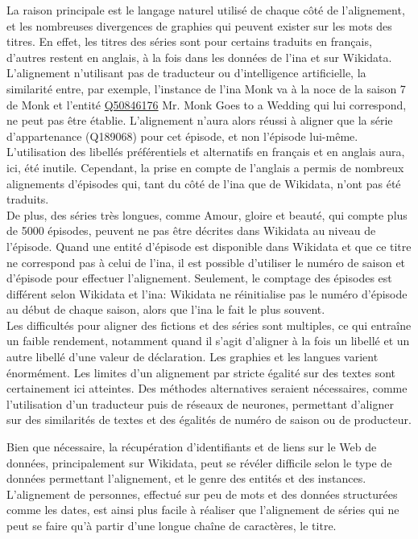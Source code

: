La raison principale est le langage naturel utilisé de chaque côté de l'alignement, et les nombreuses divergences de graphies qui peuvent exister sur les mots des titres. En effet, les titres des séries sont pour certains traduits en français, d'autres restent en anglais, à la fois dans les données de l'\ac{ina} et sur Wikidata. L'alignement n'utilisant pas de traducteur ou d'intelligence artificielle, la similarité entre, par exemple, l'instance de l'\ac{ina} \og Monk va à la noce\fg{} de la saison 7 de Monk et l'entité \href{https://www.wikidata.org/wiki/Q50846176}{Q50846176} \og Mr. Monk Goes to a Wedding\fg{} qui lui correspond, ne peut pas être établie. L'alignement n'aura alors réussi à aligner que la série d'appartenance (Q189068) pour cet épisode, et non l'épisode lui-même. L'utilisation des libellés préférentiels et alternatifs en français et en anglais aura, ici, été inutile. Cependant, la prise en compte de l'anglais a permis de nombreux alignements d'épisodes qui, tant du côté de l'\ac{ina} que de Wikidata, n'ont pas été traduits.\\

De plus, des séries très longues, comme \og Amour, gloire et beauté\fg{}, qui compte plus de 5000 épisodes, peuvent ne pas être décrites dans Wikidata au niveau de l'épisode. Quand une entité d'épisode est disponible dans Wikidata et que ce titre ne correspond pas à celui de l'\ac{ina}, il est possible d'utiliser le numéro de saison et d'épisode pour effectuer l'alignement. Seulement, le comptage des épisodes est différent selon Wikidata et l'\ac{ina}: Wikidata ne réinitialise pas le numéro d'épisode au début de chaque saison, alors que l'\ac{ina} le fait le plus souvent.\\

Les difficultés pour aligner des fictions et des séries sont multiples, ce qui entraîne un faible rendement, notamment quand il s'agit d'aligner à la fois un libellé et un autre libellé d'une valeur de déclaration. Les graphies et les langues varient énormément. Les limites d'un alignement par stricte égalité sur des textes sont certainement ici atteintes. Des méthodes alternatives seraient nécessaires, comme l'utilisation d'un traducteur puis de réseaux de neurones, permettant d'aligner sur des similarités de textes et des égalités de numéro de saison ou de producteur.

\bigskip
\bigskip
Bien que nécessaire, la récupération d'identifiants et de liens sur le Web de données, principalement sur Wikidata, peut se révéler difficile selon le type de données permettant l'alignement, et le genre des entités et des instances. L'alignement de personnes, effectué sur peu de mots et des données structurées comme les dates, est ainsi plus facile à réaliser que l'alignement de séries qui ne peut se faire qu'à partir d'une longue chaîne de caractères, le titre.
